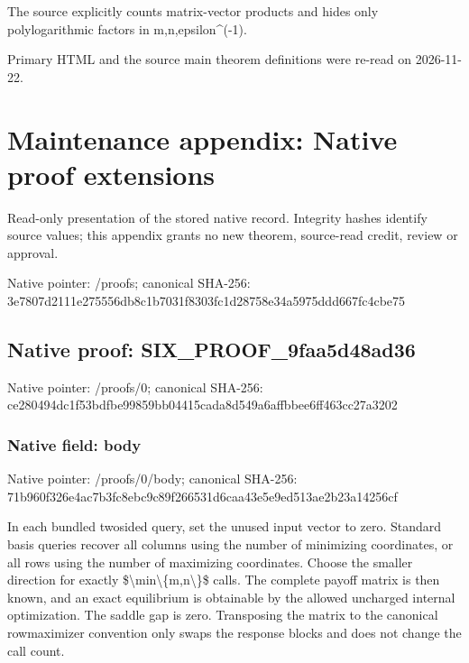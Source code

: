 \documentclass[10pt,a4paper]{article}
\begin{document}
The source explicitly counts matrix-vector products and hides only polylogarithmic factors in m,n,epsilon\textasciicircum{}(-1).



Primary HTML and the source main theorem definitions were re-read on 2026-11-22.



\section{Maintenance appendix: Native proof extensions}


Read-only presentation of the stored native record. Integrity hashes identify source values; this appendix grants no new theorem, source-read credit, review or approval.



Native pointer: /proofs; canonical SHA-256: 3e7807d2111e275556db8c1b\allowbreak{}7031f8303fc1d28758e34a59\allowbreak{}75ddd667fc4cbe75



\subsection{Native proof: SIX\_PROOF\_9faa5d48ad36}


Native pointer: /proofs/0; canonical SHA-256: ce280494dc1f53bdfbe99859\allowbreak{}bb04415cada8d549a6affbbe\allowbreak{}e6ff463cc27a3202



\subsubsection{Native field: body}


Native pointer: /proofs/0/body; canonical SHA-256: 71b960f326e4ac7b3fc8ebc9\allowbreak{}c89f266531d6caa43e5e9ed5\allowbreak{}13ae2b23a14256cf


In each bundled twosided query, set the unused input vector to zero. Standard basis queries recover all columns using the number of minimizing coordinates, or all rows using the number of maximizing coordinates. Choose the smaller direction for exactly \$\textbackslash{}min\textbackslash{}\{m,n\textbackslash{}\}\$ calls. The complete payoff matrix is then known, and an exact equilibrium is obtainable by the allowed uncharged internal optimization. The saddle gap is zero. Transposing the matrix to the canonical rowmaximizer convention only swaps the response blocks and does not change the call count.
\end{document}
